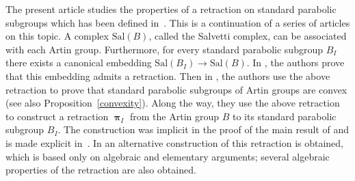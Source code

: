 \documentclass{amsart}
\numberwithin{equation}{section}
\DeclareMathOperator\bpi{\boldsymbol\pi}
\begin{document}
The present article studies the properties of a retraction on standard parabolic
subgroups which has been defined in~\cite{blufstein-paris}.
This is a continuation of a series of articles
\cite{Godelle-Paris,Charney-Paris,blufstein-paris,godelle}  on this  topic.
A  complex $\textrm{Sal}(B)$, called the Salvetti complex, can be associated
with  each Artin group. Furthermore,  for every standard parabolic subgroup
$B_I$  there exists  a canonical  embedding $\textrm{Sal}(B_I) \to
\textrm{Sal}(B)$.  In  \cite{Godelle-Paris},  the  authors  prove that this
embedding  admits a  retraction. Then  in \cite[Theorem 1.2]{Charney-Paris}, the authors
use  the above  retraction to  prove that  standard parabolic  subgroups of
Artin  groups are convex (see also Proposition~\ref{convexity}). 
Along  the way, they use  the above retraction to
construct  a retraction $\bpi_I$  from the Artin  group $B$ to its standard
parabolic subgroup $B_I$.
The construction was implicit in the proof of the main result of
\cite{Charney-Paris}  and  is  made  explicit  in~\cite{blufstein-paris}.
In \cite{godelle}  an alternative construction of this retraction is obtained,
which is based only on algebraic and elementary arguments; several algebraic
properties of the retraction are also obtained.
\end{document}
